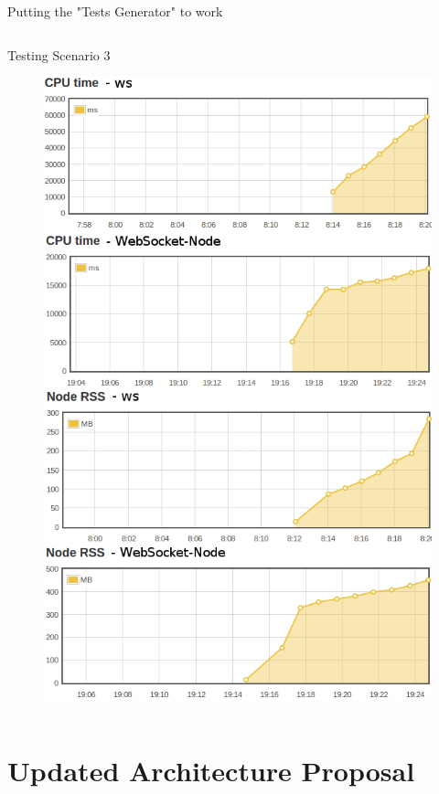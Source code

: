 \documentclass{soa.cs.pub.ro}
\begin{document}
\begin{frame}{Putting the "Tests Generator" to work}
\begin{columns}
\begin{column}[l]{0.45\textwidth}
\begin{center}
        Testing Scenario 3
      \end{center}
      \begin{figure}
         \includegraphics[scale=0.18]{img/test3v2.png}
      \end{figure}
    \end{column}
  \end{columns}
\end{frame}

\section{Updated Architecture Proposal}
\end{document}
